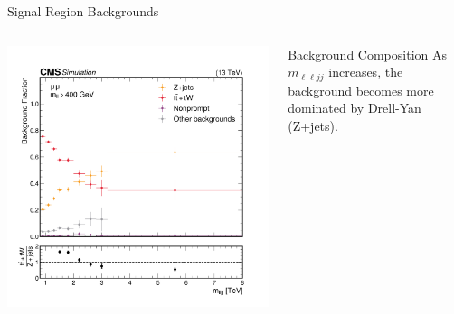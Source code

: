 \documentclass[aspectratio=169]{beamer}
\begin{document}
\begin{frame}{Signal Region Backgrounds}
  \begin{columns}
    \begin{column}{0.50\textwidth}
      \centering
      \includegraphics[width=\textwidth]{../figures/plots/sr-bkg-frac-mumu.png}
    \end{column}
    \begin{column}{0.50\textwidth}
        \vspace*{-15mm}
        \centering
        \resizebox{\columnwidth}{!}{%
        }
      \vspace{1ex} 
      \begin{block}{Background Composition}
        As $m_{\ell\ell jj}$ increases, the background becomes more dominated by Drell-Yan (Z+jets).
      \end{block}
    \end{column}
  \end{columns}
\end{frame}
\end{document}
